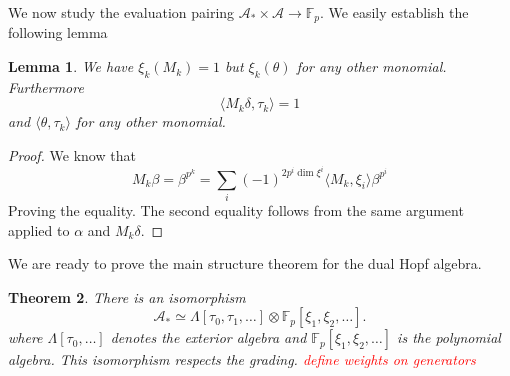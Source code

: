 \documentclass[11pt, a4paper]{article}
\newtheorem{thm}{Theorem}
\newtheorem{lemma}[thm]{Lemma}
\theoremstyle{plain}
\newtheorem*{proof}{Proof}
\begin{document}
We now study the evaluation pairing $\mathcal{A}_\ast\times \mathcal{A} \to \mathbb{F}_p$. We easily establish the following lemma
\begin{lemma}
We have $\xi_k ( M_k) =1$ but $\xi_k( \theta) $ for any other monomial.\\
Furthermore
\[ 
\langle M_k \delta, \tau_k \rangle = 1
\]
and $\langle \theta, \tau_k\rangle$ for any other monomial.
\end{lemma}
\begin{proof}
We know that
\[ 
M_k \beta = \beta^{p^{k}}= \sum_i ( -1)^{2 p^{i}\dim \xi^{i}} \langle M_k, \xi_i\rangle \beta^{p^{i}}
\]
Proving the equality. The second equality follows from the same argument applied to $\alpha$ and $M_k\delta$.
\end{proof}
We are ready to prove the main structure theorem for the dual Hopf algebra.
\begin{thm}
	There is an isomorphism
	\[ 
		\mathcal{A}_\ast \simeq \Lambda [ \tau_0,\tau_1,\ldots] \otimes \mathbb{F}_p[\xi_1,\xi_2,\ldots].
	\]
	where $\Lambda[\tau_0,\ldots]$ denotes the exterior algebra and $\mathbb{F}_p[\xi_1,\xi_2,\ldots]$ is the polynomial algebra. This isomorphism respects the grading.
	\textcolor{red}{define weights on generators}
\end{thm}
\end{document}
